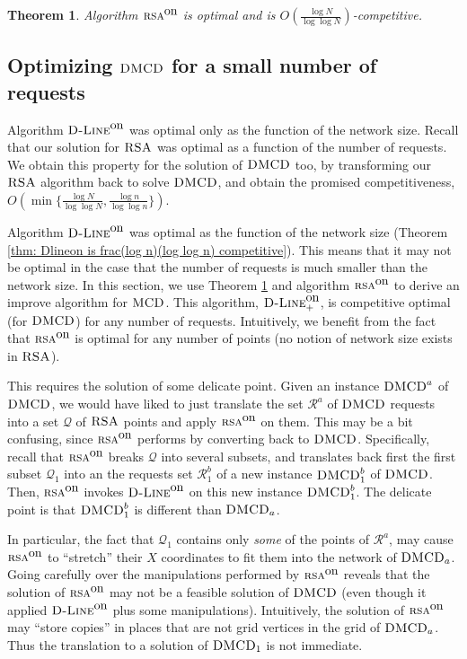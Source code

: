 \documentclass[11pt]{article}
\newtheorem{theorem}{Theorem}[section]
\newcommand{\MCD}{\mbox{\sc MCD}}
\newcommand{\DMCD}{\mbox{\sc DMCD}}
\newcommand{\RSA}{\mbox{\sc RSA}}
\newcommand{\calR}{\mathcal{R}}
\newcommand{\calQ}{\mathcal{Q}}
\newcommand{\onRSA}{\mbox{\sc rsa}^{\mbox{\upshape on}}}
\newcommand{\Dlineon}[0]{\mbox{{\sc D-Line}}^{\mbox{\upshape on}}}
\newcommand{\Dlineonp}{\mbox{\sc D-Line}_+^{\mbox{\upshape on}}}
\begin{document}
\begin{theorem}
Algorithm $\onRSA$ is optimal and is $O(\frac{\log N}{\log \log N})$-competitive.
\label{thm: onRSA}
\end{theorem}












\subsection{Optimizing $\DMCD$ for a small number of requests}
\label{sec:Optimal-mcd-for-few-requests}
Algorithm $\Dlineon$ was optimal only as the function of the network size.
Recall that our solution for $\RSA$ was optimal as a function of the number of requests.
We obtain this property for the solution of $\DMCD$ too, by   transforming our $\RSA$ algorithm back to solve $\DMCD$, and obtain the promised competitiveness,
 $O(  \min \{ \frac{\log N}{\log \log N}  ,  \frac{\log n}{\log \log n} \})$.



Algorithm $\Dlineon$ was optimal as the function of the network size (Theorem \ref{thm: Dlineon is frac(log n)(log log n) competitive}).
This means that it may not be optimal in the case that the number of requests is much smaller than the network size. In this section, we use Theorem \ref{thm: onRSA} and algorithm $\onRSA$ to derive an improve algorithm for $\MCD$. This algorithm, $\Dlineonp$, is competitive optimal (for $\DMCD$) for any number of requests.
Intuitively, we benefit from the fact that $\onRSA$ is optimal for any number of points (no notion of network size exists in $\RSA$).

This requires the solution of some delicate point. Given an instance $\DMCD^a$ of $\DMCD$, we would have liked to just translate the set $\calR^a$ of $\DMCD$ requests into a set $\calQ$ of $\RSA$ points and
apply $\onRSA$ on them.
This may be a bit confusing, since $\onRSA$ performs by converting back to $\DMCD$.
Specifically,
recall that
 $\onRSA$ breaks $\calQ$ into several subsets, and translates back first the first subset $\calQ_1$ into an the requests set $\calR^b_1$ of a new instance
 $\DMCD^b_1$ of $\DMCD$.
Then, $\onRSA$ invokes  $\Dlineon$ on this new instance $\DMCD^b_1$.
The delicate point is that $\DMCD^b_1$ is different than $\DMCD_a$.

In particular, the fact that $\calQ_1$ contains only {\em some} of the points of $\calR^a$, may cause $\onRSA$ to ``stretch'' their $X$ coordinates to fit them into the network of $\DMCD_a$.
Going carefully over the manipulations performed by $\onRSA$
reveals that the solution of $\onRSA$ may not be a feasible solution
of $\DMCD$ (even though it applied $\Dlineon$ plus some manipulations).
Intuitively, the solution of $\onRSA$
  may ``store copies'' in places that are not grid vertices in the grid of $\DMCD_a$. Thus the translation to a solution of $\DMCD_1$ is not immediate.
\end{document}
